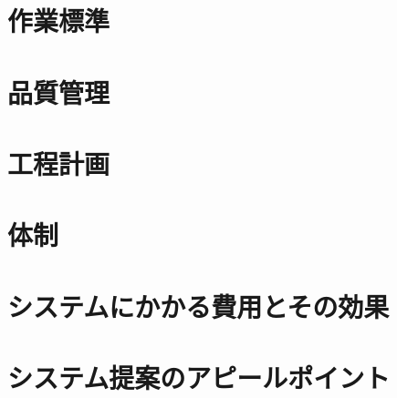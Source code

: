 \documentclass[a4j]{jarticle}
\begin{document}
\section{作業標準}


\section{品質管理}


\section{工程計画}


\section{体制}


\section{システムにかかる費用とその効果}


\section{システム提案のアピールポイント}

\end{document}
